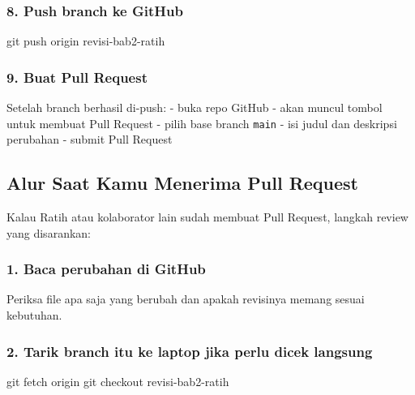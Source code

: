 \documentclass[
]{article}
\newenvironment{Shaded}{}{}
\newcommand{\FunctionTok}[1]{\textcolor[rgb]{0.02,0.16,0.49}{#1}}
\newcommand{\NormalTok}[1]{#1}
\begin{document}
\subsubsection{8. Push branch ke GitHub}\label{push-branch-ke-github}

\begin{Shaded}
\begin{Highlighting}[]
\FunctionTok{git}\NormalTok{ push origin revisi{-}bab2{-}ratih}
\end{Highlighting}
\end{Shaded}

\subsubsection{9. Buat Pull Request}\label{buat-pull-request}

Setelah branch berhasil di-push: - buka repo GitHub - akan muncul tombol
untuk membuat Pull Request - pilih base branch \texttt{main} - isi judul
dan deskripsi perubahan - submit Pull Request

\subsection{Alur Saat Kamu Menerima Pull
Request}\label{alur-saat-kamu-menerima-pull-request}

Kalau Ratih atau kolaborator lain sudah membuat Pull Request, langkah
review yang disarankan:

\subsubsection{1. Baca perubahan di
GitHub}\label{baca-perubahan-di-github}

Periksa file apa saja yang berubah dan apakah revisinya memang sesuai
kebutuhan.

\subsubsection{2. Tarik branch itu ke laptop jika perlu dicek
langsung}\label{tarik-branch-itu-ke-laptop-jika-perlu-dicek-langsung}

\begin{Shaded}
\begin{Highlighting}[]
\FunctionTok{git}\NormalTok{ fetch origin}
\FunctionTok{git}\NormalTok{ checkout revisi{-}bab2{-}ratih}
\end{Highlighting}
\end{Shaded}
\end{document}
